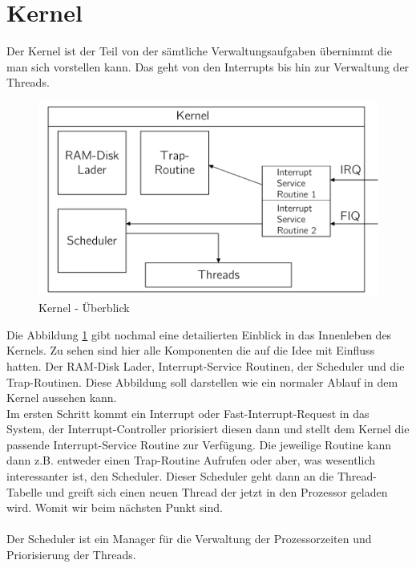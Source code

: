 \section{Kernel}
Der Kernel ist der Teil von \mops der s\"amtliche Verwaltungsaufgaben \"ubernimmt die man sich vorstellen kann. Das geht von den Interrupts bis hin zur Verwaltung der Threads.
\begin{figure}[h!]
	\centering
	\includegraphics[scale=0.60]{common/draft-kernel.pdf}	
	\caption{Kernel - \"Uberblick}
	\label{draft:draft-kernel}
\end{figure}\newpage\noindent
Die Abbildung \ref{draft:draft-kernel} gibt nochmal eine detailierten Einblick in das Innenleben des Kernels. Zu sehen sind hier alle Komponenten die auf die Idee mit Einfluss hatten. Der RAM-Disk Lader, Interrupt-Service Routinen, der Scheduler und die Trap-Routinen. Diese Abbildung soll darstellen wie ein normaler Ablauf in dem Kernel aussehen kann. \\
Im ersten Schritt kommt ein Interrupt oder Fast-Interrupt-Request in das System, der Interrupt-Controller priorisiert diesen dann und stellt dem Kernel die passende Interrupt-Service Routine zur Verf\"ugung. Die jeweilige Routine kann dann z.B. entweder einen Trap-Routine Aufrufen oder aber, was wesentlich interessanter ist, den Scheduler. Dieser Scheduler geht dann an die Thread-Tabelle und greift sich einen neuen Thread der jetzt in den Prozessor geladen wird. Womit wir beim n\"achsten Punkt sind.\\ \\
Der Scheduler ist ein Manager f\"ur die Verwaltung der Prozessorzeiten und Priorisierung der Threads.
